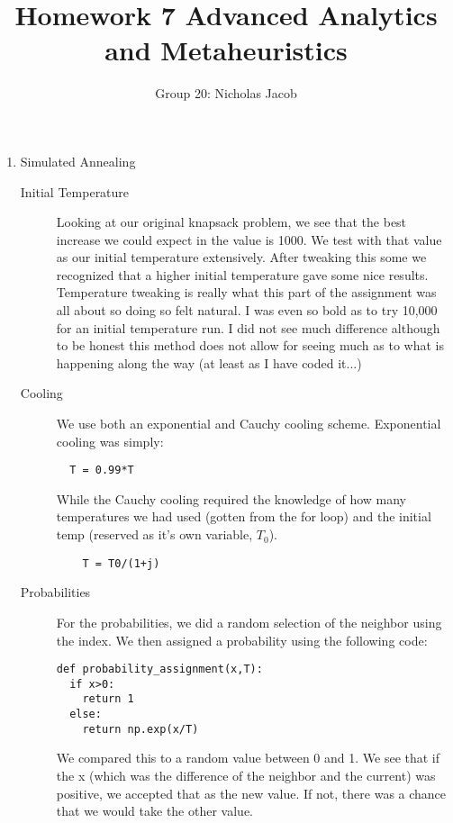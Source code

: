 \documentclass[11pt]{article}
\author{Group 20: Nicholas Jacob}
\title{Homework 7 Advanced Analytics and Metaheuristics}
\begin{document}
\maketitle

\begin{enumerate}
\item Simulated Annealing

\begin{description}
\item[Initial Temperature]  Looking at our original knapsack problem, we see that the best increase we could expect in the value is 1000.  We test with that value as our initial temperature extensively.  After tweaking this some we recognized that a higher initial temperature gave some nice results.  Temperature tweaking is really what this part of the assignment was all about so doing so felt natural.  I was even so bold as to try 10,000 for an initial temperature run.  I did not see much difference although to be honest this method does not allow for seeing much as to what is happening along the way (at least as I have coded it...)
\item[Cooling]  We use both an exponential and Cauchy cooling scheme. Exponential cooling was simply:
\begin{verbatim}
  T = 0.99*T
\end{verbatim}
While the Cauchy cooling required the knowledge of how many temperatures we had used (gotten from the for loop) and the initial temp (reserved as it's own variable, $T_0$).
\begin{verbatim}
	T = T0/(1+j)
\end{verbatim}
\item[Probabilities] For the probabilities, we did a random selection of the neighbor using the index.  We then assigned a probability using the following code:
\begin{verbatim}
def probability_assignment(x,T):
  if x>0:
    return 1
  else:
    return np.exp(x/T)
\end{verbatim}
We compared this to a random value between 0 and 1.  We see that if the x (which was the difference of the neighbor and the current) was positive, we accepted that as the new value.  If not, there was a chance that we would take the other value.

\end{description}
\end{enumerate}
\end{document}
